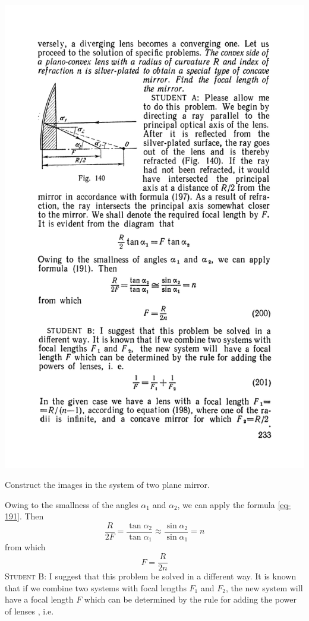 \documentclass[a4paper,sfsidenotes]{tufte-book}
\begin{document}
\begin{marginfigure}%
\includegraphics[width=1.1\linewidth]{fig-140a}
\caption{Construct the images in the system of two plane mirror.}
\label{fig-140}
\end{marginfigure}
Owing to the smallness of the angles $\alpha_{1}$ and $\alpha_{2}$, we can apply the formula \ref{eq-191}. Then
\begin{equation*}%
\frac{R}{2F} = \frac{\tan \alpha_{2}}{\tan \alpha_{1}} \approx \frac{\sin \alpha_{2}}{ \sin \alpha_{1}} = n
\end{equation*}
from which
\begin{equation}
F = \frac{R}{2n} 
\label{eq-200}
\end{equation}
\textsc{Student B:} I suggest that this problem be solved in a different way. It is known that if we combine two systems with focal lengths $F_{1}$ and $F_{2}$, the new system will have a focal length $F$ which can be determined by the rule for adding the power of lenses , i.e. 
\end{document}
